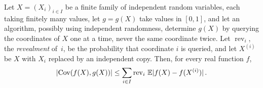 \begin{lemma}\label{lem:osss}
Let $X=(X_i)_{i\in I}$ be a finite family of independent random variables, each taking finitely many
values, let $g=g(X)$ take values in
$[0,1]$, and let an algorithm, possibly using independent randomness, determine $g(X)$ by querying the
coordinates of $X$ one at a time, never the same coordinate twice. Let $\operatorname{rev}_i$, the
\emph{revealment} of~$i$, be the probability that coordinate $i$ is queried, and let $X^{(i)}$ be $X$ with $X_i$ replaced by an independent copy.
Then, for every real function $f$,
\begin{equation*}
  \lvert\operatorname{Cov}(f(X),g(X))\rvert\le\sum_{i\in I}\operatorname{rev}_i\,\mathbb E\lvert f(X)-f(X^{(i)})\rvert\,.
\end{equation*}
\end{lemma}

